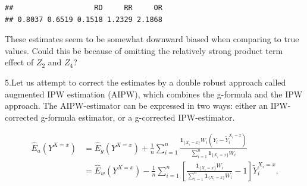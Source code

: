 \documentclass[
]{book}
\newenvironment{Shaded}{\begin{snugshade}}{\end{snugshade}}
\newcommand{\DecValTok}[1]{\textcolor[rgb]{0.00,0.00,0.81}{#1}}
\newcommand{\DocumentationTok}[1]{\textcolor[rgb]{0.56,0.35,0.01}{\textbf{\textit{#1}}}}
\newcommand{\FunctionTok}[1]{\textcolor[rgb]{0.13,0.29,0.53}{\textbf{#1}}}
\newcommand{\NormalTok}[1]{#1}
\newcommand{\OtherTok}[1]{\textcolor[rgb]{0.56,0.35,0.01}{#1}}
\newcommand{\SpecialCharTok}[1]{\textcolor[rgb]{0.81,0.36,0.00}{\textbf{#1}}}
\begin{document}
\begin{verbatim}
##                   RD     RR     OR 
## 0.8037 0.6519 0.1518 1.2329 2.1868
\end{verbatim}

These estimates seem to be somewhat downward biased when comparing to
true values. Could this be because of omitting the relatively strong
product term effect of \(Z_2\) and \(Z_4\)?

5.Let us attempt to correct the estimates by a double robust approach
called augmented IPW estimation (AIPW), which combines the g-formula and
the IPW approach. The AIPW-estimator can be expressed in two ways:
either an IPW-corrected g-formula estimator, or a g-corrected
IPW-estimator.

\[
\begin{aligned}
 \widehat{E}_a(Y^{X=x}) & = \widehat{E}_g(Y^{X=x}) +
   \frac{1}{n} \sum_{i=1}^n \frac{ {\mathbf 1}_{\{X_i=x\}} W_i ( Y_i - \widetilde{Y}_i^{X_i=x} ) }
   {\sum_{i=1}^n {\mathbf 1}_{\{X_i=x\}} W_i} \\
       & =   \widehat{E}_w(Y^{X=x}) -
    \frac{1}{n} \sum_{i=1}^n \left[ \frac{ {\mathbf 1}_{\{X_i=x\}} W_i }
            {\sum_{i=1}^n {\mathbf 1}_{\{X_i=x\}} W_i } - 1 \right] \widetilde{Y}_i^{X_i=x}.
\end{aligned}
\]

\begin{Shaded}
\end{Shaded}
\end{document}
